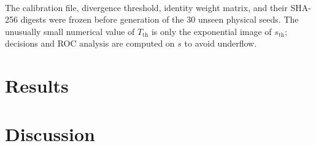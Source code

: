 \documentclass[journal]{IEEEtran}
\theoremstyle{plain}
\theoremstyle{definition}
\theoremstyle{remark}
\begin{document}
\begin{table}[!t]
\begin{tabular}{@{}l p{2.3cm} p{2.9cm}@{}}
\bottomrule
\end{tabular}
\\[2pt]
\begin{minipage}{0.98\columnwidth}
\footnotesize
The calibration file, divergence threshold, identity weight matrix, and
their SHA-256 digests were frozen before generation of the 30 unseen
physical seeds. The unusually small numerical value of $T_{\mathrm{th}}$
is only the exponential image of $s_{\mathrm{th}}$; decisions and ROC
analysis are computed on $s$ to avoid underflow.
\end{minipage}
\end{table}

\section{Results}
\label{sec:results}



\section{Discussion}
\label{sec:discussion}
\end{document}
